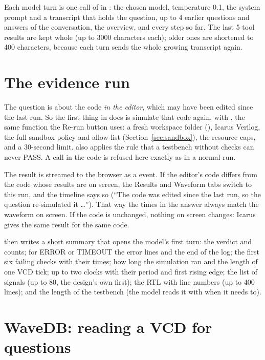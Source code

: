 Each model turn is one call of  in : the chosen model, temperature 0.1, the system prompt and a transcript that holds the question, up to 4 earlier questions and answers of the conversation, the overview, and every step so far. The last 5 tool results are kept whole (up to 3000 characters each); older ones are shortened to 400 characters, because each turn sends the whole growing transcript again.

\section{The evidence run}

The question is about the code \emph{in the editor}, which may have been edited since the last run. So the first thing  in  does is simulate that code again, with , the same function the Re-run button uses: a fresh workspace folder (), Icarus Verilog, the full sandbox policy and allow-list (Section~\ref{sec:sandbox}), the resource caps, and a 30-second limit.  also applies the rule that a testbench without checks can never PASS. A  call in the code is refused here exactly as in a normal run.

The result is streamed to the browser as a  event. If the editor's code differs from the code whose results are on screen, the Results and Waveform tabs switch to this run, and the timeline says so (``The code was edited since the last run, so the question re-simulated it \ldots''). That way the times in the answer always match the waveform on screen. If the code is unchanged, nothing on screen changes: Icarus gives the same result for the same code.

 then writes a short summary that opens the model's first turn: the verdict and counts; for ERROR or TIMEOUT the error lines and the end of the log; the first six failing checks with their times; how long the simulation ran and the length of one VCD tick; up to two clocks with their period and first rising edge; the list of signals (up to 80, the design's own first); the RTL with line numbers (up to 400 lines); and the length of the testbench (the model reads it with  when it needs to).

\section{WaveDB: reading a VCD for questions}
\label{sec:wavedb}

